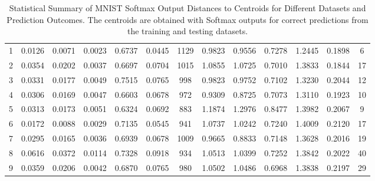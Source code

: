 \begin{table}[h]
\begin{tabular}{c|cccccc|cccccc}
1 & 0.0126 & 0.0071 & 0.0023 & 0.6737 & 0.0445 & 1129 & 0.9823 & 0.9556 & 0.7278 & 1.2445 & 0.1898 & 6 \\
2 & 0.0354 & 0.0202 & 0.0037 & 0.6697 & 0.0704 & 1015 & 1.0855 & 1.0725 & 0.7010 & 1.3833 & 0.1844 & 17 \\
3 & 0.0331 & 0.0177 & 0.0049 & 0.7515 & 0.0765 & 998 & 0.9823 & 0.9752 & 0.7102 & 1.3230 & 0.2044 & 12 \\
4 & 0.0306 & 0.0169 & 0.0047 & 0.6603 & 0.0678 & 972 & 0.9309 & 0.8725 & 0.7073 & 1.3110 & 0.1923 & 10 \\
5 & 0.0313 & 0.0173 & 0.0051 & 0.6324 & 0.0692 & 883 & 1.1874 & 1.2976 & 0.8477 & 1.3982 & 0.2067 & 9 \\
6 & 0.0172 & 0.0088 & 0.0029 & 0.7135 & 0.0545 & 941 & 1.0737 & 1.0242 & 0.7240 & 1.4009 & 0.2120 & 17 \\
7 & 0.0295 & 0.0165 & 0.0036 & 0.6939 & 0.0678 & 1009 & 0.9665 & 0.8833 & 0.7148 & 1.3628 & 0.2016 & 19 \\
8 & 0.0616 & 0.0372 & 0.0114 & 0.7328 & 0.0918 & 934 & 1.0513 & 1.0399 & 0.7252 & 1.3842 & 0.2022 & 40 \\
9 & 0.0359 & 0.0206 & 0.0042 & 0.6870 & 0.0765 & 980 & 1.0502 & 1.0486 & 0.6968 & 1.3838 & 0.2197 & 29 \\ \hline
\end{tabular}
\caption{Statistical Summary of MNIST Softmax Output Distances to Centroids for Different Datasets and Prediction Outcomes. The centroids are obtained with Softmax outputs for correct predictions from the training and testing datasets.}
\label{tab:distance_to_centroid}
\end{table}

